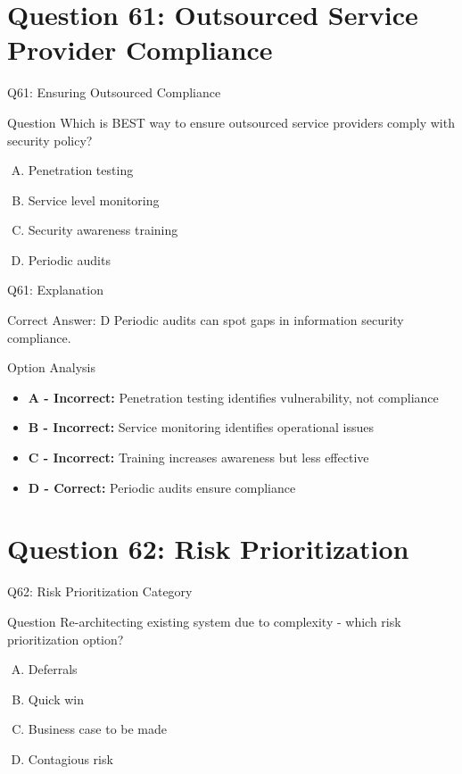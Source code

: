 \documentclass{beamer}
\begin{document}
	\section{Question 61: Outsourced Service Provider Compliance}
	
	\begin{frame}{Q61: Ensuring Outsourced Compliance}
		\begin{block}{Question}
			Which is BEST way to ensure outsourced service providers comply with security policy?
		\end{block}
		\begin{enumerate}[(A)]
			\item Penetration testing
			\item Service level monitoring
			\item Security awareness training
			\item Periodic audits
		\end{enumerate}
	\end{frame}
	
	\begin{frame}{Q61: Explanation}
		\begin{block}{Correct Answer: D}
			Periodic audits can spot gaps in information security compliance.
		\end{block}
		\begin{block}{Option Analysis}
			\begin{itemize}
				\item \textbf{A - Incorrect:} Penetration testing identifies vulnerability, not compliance
				\item \textbf{B - Incorrect:} Service monitoring identifies operational issues
				\item \textbf{C - Incorrect:} Training increases awareness but less effective
				\item \textbf{D - Correct:} Periodic audits ensure compliance
			\end{itemize}
		\end{block}
	\end{frame}
	
	\section{Question 62: Risk Prioritization}
	
	\begin{frame}{Q62: Risk Prioritization Category}
		\begin{block}{Question}
			Re-architecting existing system due to complexity - which risk prioritization option?
		\end{block}
		\begin{enumerate}[(A)]
			\item Deferrals
			\item Quick win
			\item Business case to be made
			\item Contagious risk
		\end{enumerate}
	\end{frame}
	
\end{document}
